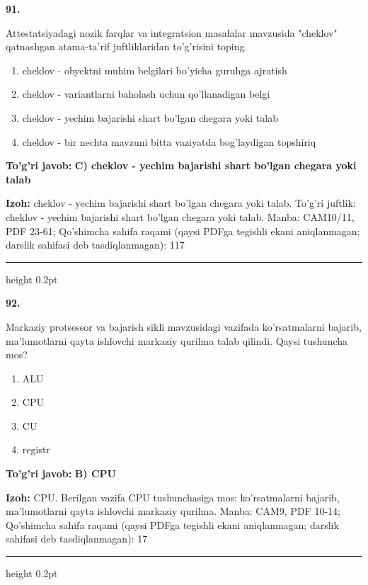 \documentclass[10pt,a4paper]{article}
\begin{document}
{\bfseries\sffamily\color{ink} 91.}
\par
Attestatsiyadagi nozik farqlar va integratsion masalalar mavzusida "cheklov" qatnashgan atama-ta'rif juftliklaridan to'g'risini toping.
\begin{enumerate}[label=\Alph*),leftmargin=9mm]
\item cheklov - obyektni muhim belgilari bo'yicha guruhga ajratish
\item cheklov - variantlarni baholash uchun qo'llanadigan belgi
\item cheklov - yechim bajarishi shart bo'lgan chegara yoki talab
\item cheklov - bir nechta mavzuni bitta vaziyatda bog'laydigan topshiriq
\end{enumerate}
\begin{tcolorbox}[enhanced,breakable,colback=teal!4,colframe=teal!60!black,boxrule=0.45pt,arc=1.2mm,left=2.7mm,right=2.7mm,top=1.8mm,bottom=1.8mm,before skip=2mm,after skip=2mm]
{\bfseries\sffamily\color{teal}To'g'ri javob:} \textbf{C) cheklov - yechim bajarishi shart bo'lgan chegara yoki talab}
\par\smallskip
{\bfseries Izoh:} cheklov - yechim bajarishi shart bo'lgan chegara yoki talab. To'g'ri juftlik: cheklov - yechim bajarishi shart bo'lgan chegara yoki talab. Manba: CAM10/11, PDF 23-61; Qo'shimcha sahifa raqami (qaysi PDFga tegishli ekani aniqlanmagan; darslik sahifasi deb tasdiqlanmagan): 117
\end{tcolorbox}
\vspace{2mm}\hrule height 0.2pt\vspace{3mm}

{\bfseries\sffamily\color{ink} 92.}
\par
Markaziy protsessor va bajarish sikli mavzusidagi vazifada ko'rsatmalarni bajarib, ma'lumotlarni qayta ishlovchi markaziy qurilma talab qilindi. Qaysi tushuncha mos?
\begin{enumerate}[label=\Alph*),leftmargin=9mm]
\item ALU
\item CPU
\item CU
\item registr
\end{enumerate}
\begin{tcolorbox}[enhanced,breakable,colback=teal!4,colframe=teal!60!black,boxrule=0.45pt,arc=1.2mm,left=2.7mm,right=2.7mm,top=1.8mm,bottom=1.8mm,before skip=2mm,after skip=2mm]
{\bfseries\sffamily\color{teal}To'g'ri javob:} \textbf{B) CPU}
\par\smallskip
{\bfseries Izoh:} CPU. Berilgan vazifa CPU tushunchasiga mos: ko'rsatmalarni bajarib, ma'lumotlarni qayta ishlovchi markaziy qurilma. Manba: CAM9, PDF 10-14; Qo'shimcha sahifa raqami (qaysi PDFga tegishli ekani aniqlanmagan; darslik sahifasi deb tasdiqlanmagan): 17
\end{tcolorbox}
\vspace{2mm}\hrule height 0.2pt\vspace{3mm}
\end{document}
